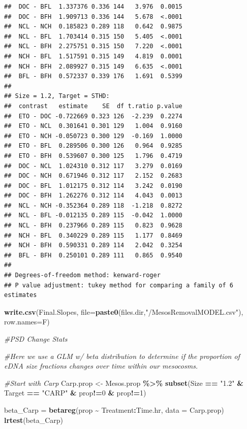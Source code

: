 \documentclass[
]{article}
\newenvironment{Shaded}{\begin{snugshade}}{\end{snugshade}}
\newcommand{\AttributeTok}[1]{\textcolor[rgb]{0.13,0.29,0.53}{#1}}
\newcommand{\CommentTok}[1]{\textcolor[rgb]{0.56,0.35,0.01}{\textit{#1}}}
\newcommand{\DecValTok}[1]{\textcolor[rgb]{0.00,0.00,0.81}{#1}}
\newcommand{\FunctionTok}[1]{\textcolor[rgb]{0.13,0.29,0.53}{\textbf{#1}}}
\newcommand{\NormalTok}[1]{#1}
\newcommand{\OtherTok}[1]{\textcolor[rgb]{0.56,0.35,0.01}{#1}}
\newcommand{\SpecialCharTok}[1]{\textcolor[rgb]{0.81,0.36,0.00}{\textbf{#1}}}
\newcommand{\StringTok}[1]{\textcolor[rgb]{0.31,0.60,0.02}{#1}}
\begin{document}
\begin{verbatim}
##  DOC - BFL  1.337376 0.336 144   3.976  0.0015
##  DOC - BFH  1.909713 0.336 144   5.678  <.0001
##  NCL - NCH  0.185823 0.289 118   0.642  0.9875
##  NCL - BFL  1.703414 0.315 150   5.405  <.0001
##  NCL - BFH  2.275751 0.315 150   7.220  <.0001
##  NCH - BFL  1.517591 0.315 149   4.819  0.0001
##  NCH - BFH  2.089927 0.315 149   6.635  <.0001
##  BFL - BFH  0.572337 0.339 176   1.691  0.5399
## 
## Size = 1.2, Target = STHD:
##  contrast   estimate    SE  df t.ratio p.value
##  ETO - DOC -0.722669 0.323 126  -2.239  0.2274
##  ETO - NCL  0.301641 0.301 129   1.004  0.9160
##  ETO - NCH -0.050723 0.300 129  -0.169  1.0000
##  ETO - BFL  0.289506 0.300 126   0.964  0.9285
##  ETO - BFH  0.539607 0.300 125   1.796  0.4719
##  DOC - NCL  1.024310 0.312 117   3.279  0.0169
##  DOC - NCH  0.671946 0.312 117   2.152  0.2683
##  DOC - BFL  1.012175 0.312 114   3.242  0.0190
##  DOC - BFH  1.262276 0.312 114   4.043  0.0013
##  NCL - NCH -0.352364 0.289 118  -1.218  0.8272
##  NCL - BFL -0.012135 0.289 115  -0.042  1.0000
##  NCL - BFH  0.237966 0.289 115   0.823  0.9628
##  NCH - BFL  0.340229 0.289 115   1.177  0.8469
##  NCH - BFH  0.590331 0.289 114   2.042  0.3254
##  BFL - BFH  0.250101 0.289 111   0.865  0.9540
## 
## Degrees-of-freedom method: kenward-roger 
## P value adjustment: tukey method for comparing a family of 6 estimates
\end{verbatim}

\begin{Shaded}
\begin{Highlighting}[]
\FunctionTok{write.csv}\NormalTok{(Final.Slopes, }\AttributeTok{file=}\FunctionTok{paste0}\NormalTok{(files.dir,}\StringTok{"/MesosRemovalMODEL.csv"}\NormalTok{), }\AttributeTok{row.names=}\NormalTok{F)}

\CommentTok{\#PSD Change Stats}

\CommentTok{\#Here we use a GLM w/ beta distribution to determine if the proportion of eDNA size fractions changes over time within our mesocosms. }

\CommentTok{\#Start with Carp}
\NormalTok{Carp.prop }\OtherTok{\textless{}{-}}\NormalTok{ Mesos.prop }\SpecialCharTok{\%\textgreater{}\%} 
  \FunctionTok{subset}\NormalTok{(Size }\SpecialCharTok{==} \StringTok{"1.2"} \SpecialCharTok{\&}\NormalTok{ Target }\SpecialCharTok{==} \StringTok{"CARP"} \SpecialCharTok{\&}\NormalTok{ prop}\SpecialCharTok{!=}\DecValTok{0} \SpecialCharTok{\&}\NormalTok{ prop}\SpecialCharTok{!=}\DecValTok{1}\NormalTok{)}
  
\NormalTok{beta\_Carp }\OtherTok{=} \FunctionTok{betareg}\NormalTok{(prop }\SpecialCharTok{\textasciitilde{}}\NormalTok{ Treatment}\SpecialCharTok{:}\NormalTok{Time.hr, }\AttributeTok{data =}\NormalTok{ Carp.prop)}
\FunctionTok{lrtest}\NormalTok{(beta\_Carp)}
\end{Highlighting}
\end{Shaded}
\end{document}
